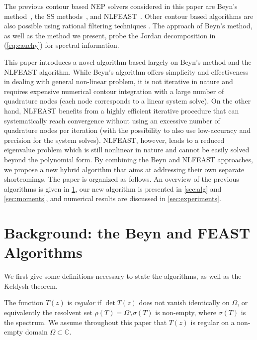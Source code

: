 \documentclass[onefignum,onetabnum]{siamart190516}
\begin{document}
The previous contour based NEP solvers considered in this paper are Beyn's method~\cite{beyn2012,vanbarel2016}, the SS methods~\cite{asakura2009,yokota2013}, and NLFEAST~\cite{gavin2018,gavin2018a}. 
Other contour based algorithms are also possible using rational filtering techniques \cite{saad2019,vanbarel2016b}.
The approach of Beyn's method, as well as the method we present, probe the 
Jordan decomposition in (\ref{eq:cauchy}) for spectral information.



This paper introduces a novel algorithm based largely on Beyn's method and the NLFEAST algorithm.
While Beyn's algorithm offers simplicity and effectiveness in dealing with general non-linear problem, it is not iterative in nature and requires expensive numerical contour integration with a large number of quadrature nodes (each node corresponds to a linear system solve). 
On the other hand, NLFEAST benefits from a highly efficient iterative procedure that can systematically reach convergence without using an excessive number of quadrature nodes per iteration (with the possibility to also use low-accuracy and precision for the system solves).
NLFEAST, however, leads to a reduced eigenvalue problem which is still nonlinear in nature and cannot be easily solved beyond the polynomial form.
By combining the Beyn and NLFEAST approaches, we propose a new hybrid algorithm that aims at addressing their own separate shortcomings.
The paper is organized as follows. An overview of the previous algorithms is given in \cref{sec:beyn},
our new algorithm is presented in \cref{sec:alg} and \cref{sec:moments}, and numerical
results are discussed in \cref{sec:experiments}.

\section{Background: the Beyn and FEAST Algorithms}
\label{sec:beyn}

We first give some definitions necessary to state the algorithms, as well as the Keldysh theorem. 

The function \( T(z) \) is \textit{regular} if \( \det T(z) \) does not vanish identically on \( \Omega \), or equivalently the resolvent set \( \rho(T) = \Omega \setminus \sigma(T) \) is non-empty, where \( \sigma(T) \) is the spectrum.
We assume throughout this paper that \( T(z) \) is regular on a non-empty domain \( \Omega \subset \mathbb{C} \).
\end{document}
